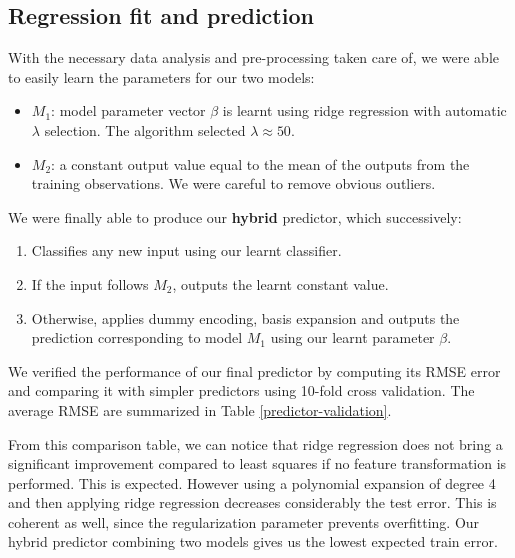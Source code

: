 \documentclass{article} %
\begin{document}
  \subsection{Regression fit and prediction} \label{regression-fit}
  With the necessary data analysis and pre-processing taken care of, we were able to easily learn the parameters for our two models:
  \begin{itemize}
    \item $M_1$: model parameter vector $\beta$ is learnt using ridge regression with automatic $\lambda$ selection. The algorithm selected $\lambda \approx 50$.
    \item $M_2$: a constant output value equal to the mean of the outputs from the training observations. We were careful to remove obvious outliers.
  \end{itemize}

  We were finally able to produce our \textbf{hybrid} predictor, which successively:
  \begin{enumerate}
    \item Classifies any new input using our learnt classifier.
    \item If the input follows $M_2$, outputs the learnt constant value.
    \item Otherwise, applies dummy encoding, basis expansion and outputs the prediction corresponding to model $M_1$ using our learnt parameter $\beta$.
  \end{enumerate}

  We verified the performance of our final predictor by computing its RMSE error and comparing it with simpler predictors using 10-fold cross validation. The average RMSE are summarized in Table \ref{predictor-validation}.

  From this comparison table, we can notice that ridge regression does not bring a significant improvement compared to least squares if no feature transformation is performed. This is expected. However using a polynomial expansion of degree 4 and then applying ridge regression decreases considerably the test error. This is coherent as well, since the regularization parameter prevents overfitting. Our hybrid predictor combining two models gives us the lowest expected train error.
\end{document}
